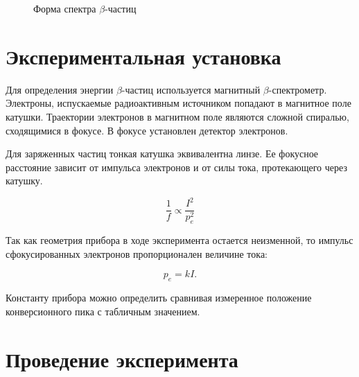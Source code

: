 \documentclass[14pt, a4paper]{report}
\begin{document}
\begin{figure}[H]
\centering
{}
\caption{Форма спектра $\beta$-частиц}
\end{figure}

\section{Экспериментальная установка}

Для определения энергии $\beta$-частиц используется магнитный $\beta$-спектрометр. Электроны, испускаемые радиоактивным источником попадают в магнитное поле катушки. Траектории электронов в магнитном поле являются сложной спиралью, сходящимися в фокусе. В фокусе установлен детектор электронов.

Для заряженных частиц тонкая катушка эквивалентна линзе. Ее фокусное расстояние зависит от импульса электронов и от силы тока, протекающего через катушку.

\[\frac{1}{f}\propto\frac{I^2}{p_e^2}\]

Так как геометрия прибора в ходе эксперимента остается неизменной, то импульс сфокусированных электронов пропорционален величине тока:

\[p_e=kI.\]

Константу прибора можно определить сравнивая измеренное положение конверсионного пика с табличным значением.

\section{Проведение эксперимента}
\end{document}
